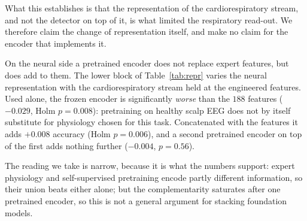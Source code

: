 \documentclass{ieeeaccess}
\begin{document}
What this establishes is that the representation of the cardiorespiratory stream, and not the detector on top of it, is what limited the respiratory read-out. We therefore claim the
change of representation itself, and make no claim for the encoder that implements it.

On the neural side a pretrained encoder does not replace expert features, but does
add to them. The lower block of Table~\ref{tab:repr} varies the neural representation with the
cardiorespiratory stream held at the engineered features. Used alone, the frozen encoder is
significantly \emph{worse} than the $188$ features ($-0.029$, Holm $p=0.008$): pretraining on
healthy scalp EEG does not by itself substitute for physiology chosen for this task.
Concatenated with the features it adds $+0.008$ accuracy (Holm $p=0.006$), and a second
pretrained encoder on top of the first adds nothing further ($-0.004$, $p=0.56$).

The reading we take is narrow, because it is what the numbers support: expert physiology and
self-supervised pretraining encode partly different information, so their union beats either
alone; but the complementarity saturates after one pretrained encoder, so this is not a
general argument for stacking foundation models.
\end{document}
